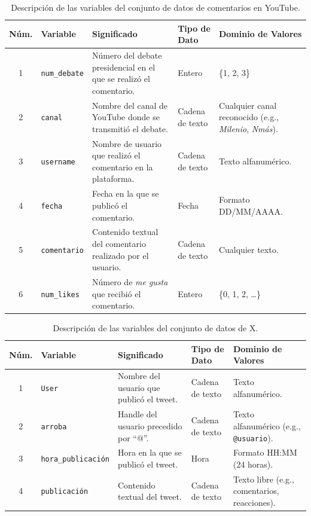 \documentclass[10pt, a4paper]{article}
\begin{document}
	\begin{table}[h]
		\centering
		\begin{tabular}{|c|l|p{6cm}|l|p{4cm}|}
			\hline
			\textbf{Núm.} & \textbf{Variable} & \textbf{Significado} & \textbf{Tipo de Dato} & \textbf{Dominio de Valores} \\
			\hline
			1 & \texttt{num\_debate} & Número del debate presidencial en el que se realizó el comentario. & Entero & \{1, 2, 3\} \\
			\hline
			2 & \texttt{canal} & Nombre del canal de YouTube donde se transmitió el debate. & Cadena de texto & Cualquier canal reconocido (e.g., \textit{Milenio}, \textit{Nmás}). \\
			\hline
			3 & \texttt{username} & Nombre de usuario que realizó el comentario en la plataforma. & Cadena de texto & Texto alfanumérico. \\
			\hline
			4 & \texttt{fecha} & Fecha en la que se publicó el comentario. & Fecha & Formato DD/MM/AAAA. \\
			\hline
			5 & \texttt{comentario} & Contenido textual del comentario realizado por el usuario. & Cadena de texto & Cualquier texto. \\
			\hline
			6 & \texttt{num\_likes} & Número de \textit{me gusta} que recibió el comentario. & Entero & \{0, 1, 2, \dots\} \\
			\hline
			
		\end{tabular}
		\caption{Descripción de las variables del conjunto de datos de comentarios en YouTube.}
		\label{tab:variables_dataset}
	\end{table}
	
	\begin{table}[h]
		\centering
		\begin{tabular}{|c|l|p{5cm}|l|p{4cm}|}
			\hline
			\textbf{Núm.} & \textbf{Variable} & \textbf{Significado} & \textbf{Tipo de Dato} & \textbf{Dominio de Valores} \\
			\hline
			1 & \texttt{User} & Nombre del usuario que publicó el tweet. & Cadena de texto & Texto alfanumérico. \\
			\hline
			2 & \texttt{arroba} & Handle del usuario precedido por ``@''. & Cadena de texto & Texto alfanumérico (e.g., \texttt{@usuario}). \\
			\hline
			3 & \texttt{hora\_publicación} & Hora en la que se publicó el tweet. & Hora & Formato HH:MM (24 horas). \\
			\hline
			4 & \texttt{publicación} & Contenido textual del tweet. & Cadena de texto & Texto libre (e.g., comentarios, reacciones). \\
			\hline
		\end{tabular}
		\caption{Descripción de las variables del conjunto de datos de X.}
		\label{tab:variables_dataset_X}
	\end{table}
	
\end{document}
